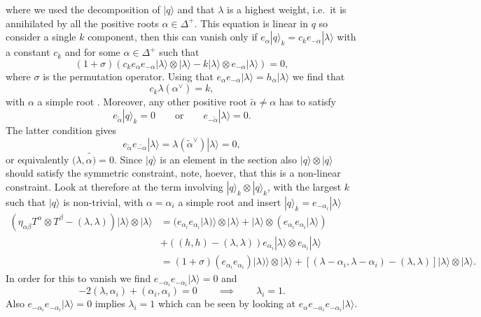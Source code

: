 where we used the decomposition of $|q\rangle$ and that $\lambda$ is a highest weight, i.e.\ it is annihilated by all the positive roots $\alpha\in\Delta^+$. This equation is linear in $q$ so consider a single $k$ component, then this can vanish only if $e_\alpha|q\rangle_k= c_ke_{-\alpha}|\lambda\rangle$ with a constant $c_k$ and for some $\alpha\in\Delta^+$ such that 
\begin{equation}
    \left(1+\sigma\right)\left(c_ke_{\alpha}e_{-\alpha}|\lambda\rangle\otimes|\lambda\rangle-k|\lambda\rangle\otimes e_{-\alpha}|\lambda\rangle\right) = 0,
\end{equation}
where $\sigma$ is the permutation operator. Using that $e_{\alpha}e_{-\alpha}|\lambda\rangle = h_\alpha |\lambda\rangle$ we find that 
\begin{equation}
    c_k \lambda(\alpha^\vee) = k,
\end{equation}
with $\alpha$ a simple root . Moreover, any other positive root $\tilde{\alpha}\neq\alpha$ has to satisfy 
\begin{equation}
    e_{\tilde{\alpha}}|q\rangle_k = 0\qquad \text{or}\qquad e_{-\tilde{\alpha}}|\lambda\rangle = 0. 
\end{equation}
The latter condition gives 
\begin{equation}
    e_{\tilde{\alpha}}e_{\tilde{-\alpha}}|\lambda\rangle = \lambda(\tilde{\alpha}^\vee)|\lambda\rangle=0,
\end{equation}
or equivalently $(\lambda,\tilde{\alpha)}=0$. Since $|q\rangle$ is an element in the section also $|q\rangle\otimes|q\rangle$ should satisfy the symmetric constraint, note, hoever, that this is a non-linear constraint. Look at therefore at the term involving $|q\rangle_k\otimes|q\rangle_k$, with the largest $k$ such that $|q\rangle$ is non-trivial, with $\alpha=\alpha_i$ a simple root and insert $|q\rangle_k=e_{-\alpha_i}|\lambda\rangle$
\begin{equation}
    \begin{aligned}
    \left(\eta_{\alpha\beta}T^\alpha\otimes T^\beta-(\lambda,\lambda)\right)|\lambda\rangle\otimes|\lambda\rangle &= (e_{\alpha_i}e_{\alpha_i}|\lambda)\rangle\otimes|\lambda\rangle+|\lambda\rangle\otimes (e_{\alpha_i}e_{\alpha_i}|\lambda\rangle)\\
    &+\left((h,h)-(\lambda,\lambda)\right)e_{\alpha_i}|\lambda\rangle\otimes e_{\alpha_i}|\lambda\rangle\\
    &= (1+\sigma)(e_{\alpha_i}e_{\alpha_i})|\lambda)\rangle\otimes|\lambda\rangle+\left[(\lambda-\alpha_i,\lambda-\alpha_i)-(\lambda,\lambda)\right]|\lambda\rangle\otimes|\lambda\rangle.
    \end{aligned}
\end{equation}
In order for this to vanish we find $e_{-\alpha_i}e_{-\alpha_i}|\lambda\rangle =0$ and 
\begin{equation}
    -2(\lambda,\alpha_i)+(\alpha_i,\alpha_i)=0\qquad \implies\qquad \lambda_i = 1.
\end{equation}
Also $e_{-\alpha_i}e_{-\alpha_i}|\lambda\rangle =0$ implies $\lambda_i=1$ which can be seen by looking at $e_{\alpha}e_{-\alpha_i}e_{-\alpha_i}|\lambda\rangle$. 

